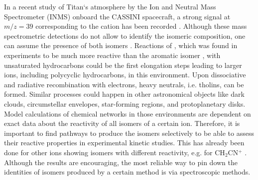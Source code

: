 In a recent study of Titan`s atmosphere by the Ion and Neutral Mass Spectrometer (INMS) onboard the CASSINI spacecraft, a strong signal at $m/z=39$ corresponding to the \iso cation has been recorded \citep{VYM2007}. Although these mass spectrometric detections do not allow to identify the isomeric composition, one can assume the presence of both \iso isomers \citep{Ali2013}. Reactions of \linn, which was found in experiments to be much more reactive than the aromatic \cyc isomer \citep{SLA1982,MMF1994,Anicich1993}, with unsaturated hydrocarbons could be the first elongation steps leading to larger ions, including polycyclic hydrocarbons, in this environment. Upon dissociative and radiative recombination with electrons, heavy neutrals, i.e. tholins, can be formed. Similar processes could happen in other astronomical objects like dark clouds, circumstellar envelopes, star-forming regions, and protoplanetary disks. Model calculations of chemical networks in those environments are dependent on exact data about the reactivity of all isomers of a certain ion. Therefore, it is important to find pathways to produce the isomers selectively to be able to assess their reactive properties in experimental kinetic studies. This has already been done for other ions showing isomers with different reactivity, e.g. for CH$_2$CN$^+$ \citep[][and references therein]{FGK2016}. Although the results are encouraging, the most reliable way to pin down the identities of isomers produced by a certain method is via spectroscopic methods. \\

